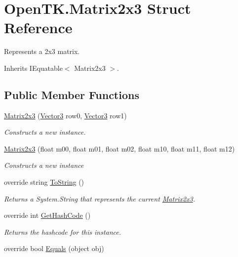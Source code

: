 \hypertarget{struct_open_t_k_1_1_matrix2x3}{\section{Open\-T\-K.\-Matrix2x3 Struct Reference}
\label{struct_open_t_k_1_1_matrix2x3}
}


Represents a 2x3 matrix.  




Inherits I\-Equatable$<$ Matrix2x3 $>$.

\subsection*{Public Member Functions}
\begin{DoxyCompactItemize}
\item 
\hyperlink{struct_open_t_k_1_1_matrix2x3_a1fe06b3d4b2a3f8c60944c74ec153706}{Matrix2x3} (\hyperlink{struct_open_t_k_1_1_vector3}{Vector3} row0, \hyperlink{struct_open_t_k_1_1_vector3}{Vector3} row1)
\begin{DoxyCompactList}\small\item\em Constructs a new instance. \end{DoxyCompactList}\item 
\hyperlink{struct_open_t_k_1_1_matrix2x3_a31e86b43e1fd79ed94d58304a814b160}{Matrix2x3} (float m00, float m01, float m02, float m10, float m11, float m12)
\begin{DoxyCompactList}\small\item\em Constructs a new instance \end{DoxyCompactList}\item 
override string \hyperlink{struct_open_t_k_1_1_matrix2x3_ab697a9cdcb9ecc4a3afd0377f65775e3}{To\-String} ()
\begin{DoxyCompactList}\small\item\em Returns a System.\-String that represents the current \hyperlink{struct_open_t_k_1_1_matrix2x3}{Matrix2x3}. \end{DoxyCompactList}\item 
override int \hyperlink{struct_open_t_k_1_1_matrix2x3_a3867f8941af9a6d9bff21b0395cc05e7}{Get\-Hash\-Code} ()
\begin{DoxyCompactList}\small\item\em Returns the hashcode for this instance. \end{DoxyCompactList}\item 
override bool \hyperlink{struct_open_t_k_1_1_matrix2x3_ae7b2e74b9bae960261842cbd28544308}{Equals} (object obj)

\end{DoxyCompactItemize}
